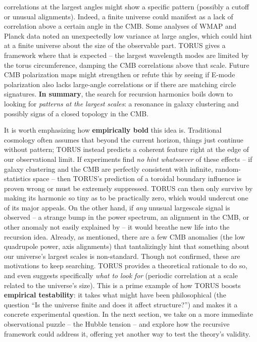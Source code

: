 \documentclass[]{article}
\begin{document}
correlations at the largest angles might show a specific pattern
(possibly a cutoff or unusual alignments). Indeed, a finite universe
could manifest as a lack of correlation above a certain angle in the
CMB. Some analyses of WMAP and Planck data noted an unexpectedly low
variance at large angles, which could hint at a finite universe about
the size of the observable part. TORUS gives a framework where that is
expected -- the largest wavelength modes are limited by the torus
circumference, damping the CMB correlations above that scale. Future CMB
polarization maps might strengthen or refute this by seeing if E-mode
polarization also lacks large-angle correlations or if there are
matching circle signatures. \textbf{In summary}, the search for
recursion harmonics boils down to looking for \emph{patterns at the
largest scales}: a resonance in galaxy clustering and possibly signs of
a closed topology in the CMB.

It is worth emphasizing how \textbf{empirically bold} this idea is.
Traditional cosmology often assumes that beyond the current horizon,
things just continue without pattern; TORUS instead predicts a coherent
feature right at the edge of our observational limit. If experiments
find \emph{no hint whatsoever} of these effects -- if galaxy clustering
and the CMB are perfectly consistent with infinite, random-statistics
space -- then TORUS's prediction of a toroidal boundary influence is
proven wrong or must be extremely suppressed​. TORUS can then only
survive by making its harmonic so tiny as to be practically zero, which
would undercut one of its major appeals. On the other hand, if
\emph{any} unusual largescale signal is observed -- a strange bump in
the power spectrum, an alignment in the CMB, or other anomaly not easily
explained by \LambdaCDM -- it would breathe new life into the recursion idea.
Already, as mentioned, there are a few CMB anomalies (the low quadrupole
power, axis alignments) that tantalizingly hint that something about our
universe's largest scales is non-standard​. Though not confirmed, these
are motivations to keep searching. TORUS provides a theoretical
rationale to do so, and even suggests specifically \emph{what to look
for} (periodic correlation at a scale related to the universe's size).
This is a prime example of how TORUS boosts \textbf{empirical
testability}: it takes what might have been philosophical (the question
``Is the universe finite and does it affect structure?'') and makes it a
concrete experimental question. In the next section, we take on a more
immediate observational puzzle -- the Hubble tension -- and explore how
the recursive framework could address it, offering yet another way to
test the theory's validity.
\end{document}
